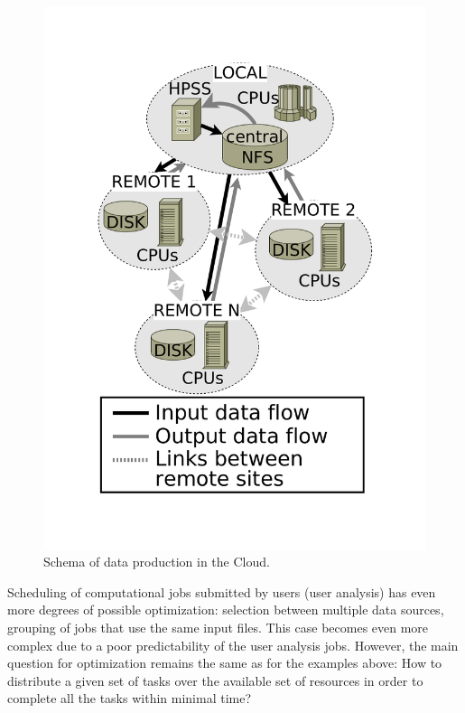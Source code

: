 \documentclass[english]{ddny}
\begin{document}
\begin{figure}[h]
\centering
    \includegraphics[trim =30mm 30mm 30mm 30mm ,clip, width=.4\textwidth]{pic/Data_production_general_bw2.pdf}
    \caption{Schema of data production in the Cloud.}
    \label{fig:simulated grig}
\end{figure}

Scheduling of computational jobs submitted by users (user analysis) has even more degrees of possible optimization: selection between multiple data sources, grouping of jobs that use the same input files. This case becomes even more complex due to a poor predictability of the user analysis jobs. However,  the main question for optimization remains the same as for the examples above: How to distribute a given set of tasks over the available set of resources in order to complete all the tasks within minimal time?
\end{document}

